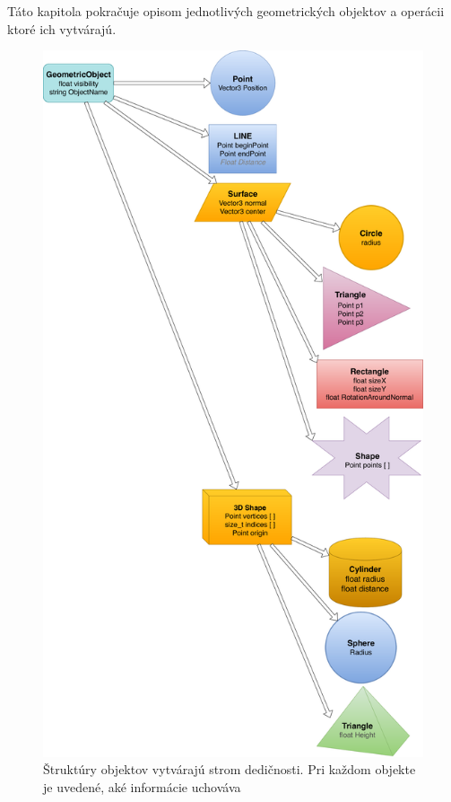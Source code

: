 Táto kapitola pokračuje opisom jednotlivých geometrických objektov a operácii ktoré ich vytvárajú.

\begin{figure}[]
	\centering
	\includegraphics[height=0.95\textheight]{obrazky-figures/Diagram/Draw/DP Navrh operacii-Structure.pdf}
	\caption{Štruktúry objektov vytvárajú strom dedičnosti. Pri každom objekte je uvedené, aké informácie uchováva}
	\label{fig:StromDedicnosti}
\end{figure}

